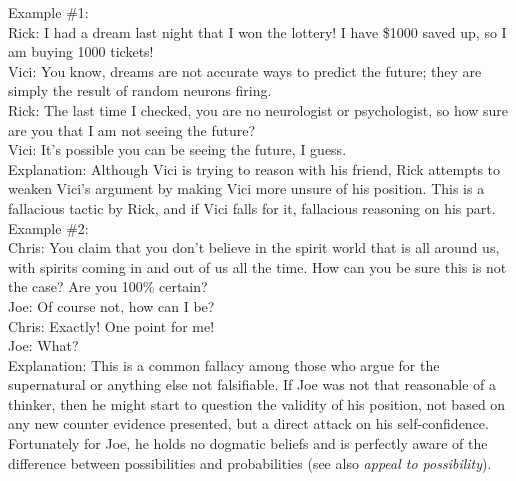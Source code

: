 \documentclass[a4paper,12pt,single,pdftex]{scrartcl}
\begin{document}
    
      Example \#1:
    \\

    
      Rick: I had a dream last night that I won the lottery!  I have \$1000 saved up, so I am buying 1000 tickets!
    \\

    
      Vici: You know, dreams are not accurate ways to predict the future; they are simply the result of random neurons firing.
    \\

    
      Rick: The last time I checked, you are no neurologist or psychologist, so how sure are you that I am not seeing the future?
    \\

    
      Vici: It’s possible you can be seeing the future, I guess.
    \\

    
      Explanation: Although Vici is trying to reason with his friend, Rick attempts to weaken Vici’s argument by making Vici more unsure of his position.  This is a fallacious tactic by Rick, and if Vici falls for it, fallacious reasoning on his part.
    \\

    
      Example \#2:
    \\

    
      Chris: You claim that you don’t believe in the spirit world that is all around us, with spirits coming in and out of us all the time.  How can you be sure this is not the case?  Are you 100\% certain?
    \\

    
      Joe: Of course not, how can I be?
    \\

    
      Chris: Exactly! One point for me!
    \\

    
      Joe: What?
    \\

    
      Explanation: This is a common fallacy among those who argue for the supernatural or anything else not falsifiable.  If Joe was not that reasonable of a thinker, then he might start to question the validity of his position, not based on any new counter evidence presented, but a direct attack on his self-confidence.  Fortunately for Joe, he holds no dogmatic beliefs and is perfectly aware of the difference between possibilities and probabilities (see also {\it appeal to possibility}).
    \\
\end{document}
